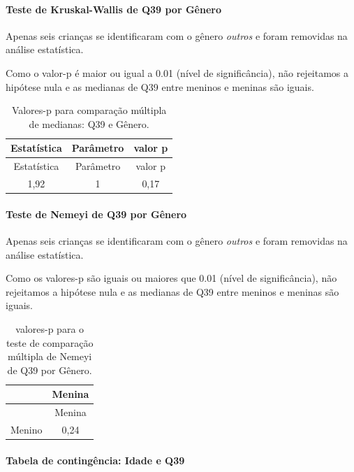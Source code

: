 \documentclass[]{article}
\let\oldparagraph\paragraph
\renewcommand{\paragraph}[1]{\oldparagraph{#1}\mbox{}}
\begin{document}
\hypertarget{teste-de-kruskal-wallis-de-q39-por-guxeanero}{%
\paragraph{Teste de Kruskal-Wallis de Q39 por Gênero}\label{teste-de-kruskal-wallis-de-q39-por-guxeanero}}

Apenas seis crianças se identificaram com o gênero \emph{outros} e foram removidas na análise estatística.

Como o valor-p é maior ou igual a 0.01 (nível de significância), não rejeitamos a hipótese nula e as medianas de Q39 entre meninos e meninas são iguais.

\begin{longtable}[]{@{}ccc@{}}
\caption{\label{tab:unnamed-chunk-1504}Valores-p para comparação múltipla de medianas: Q39 e Gênero.}\tabularnewline
\toprule
Estatística & Parâmetro & valor p\tabularnewline
\midrule
\endfirsthead
\toprule
Estatística & Parâmetro & valor p\tabularnewline
\midrule
\endhead
1,92 & 1 & 0,17\tabularnewline
\bottomrule
\end{longtable}

\hypertarget{teste-de-nemeyi-de-q39-por-guxeanero}{%
\paragraph{Teste de Nemeyi de Q39 por Gênero}\label{teste-de-nemeyi-de-q39-por-guxeanero}}

Apenas seis crianças se identificaram com o gênero \emph{outros} e foram removidas na análise estatística.

Como os valores-p são iguais ou maiores que 0.01 (nível de significância), não rejeitamos a hipótese nula e as medianas de Q39 entre meninos e meninas são iguais.

\begin{longtable}[]{@{}lc@{}}
\caption{\label{tab:unnamed-chunk-1506}valores-p para o teste de comparação múltipla de Nemeyi de Q39 por Gênero.}\tabularnewline
\toprule
& Menina\tabularnewline
\midrule
\endfirsthead
\toprule
& Menina\tabularnewline
\midrule
\endhead
Menino & 0,24\tabularnewline
\bottomrule
\end{longtable}

\cleardoublepage

\hypertarget{tabela-de-continguxeancia-idade-e-q39}{%
\paragraph{Tabela de contingência: Idade e Q39}\label{tabela-de-continguxeancia-idade-e-q39}}
\end{document}
